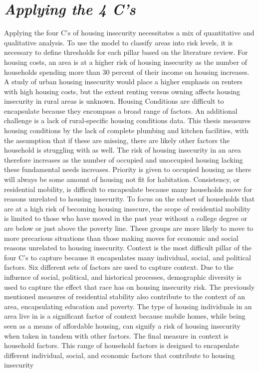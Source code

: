 \section{\textit{Applying the 4 C's}}
Applying the four C's of housing insecurity necessitates a mix of quantitative and qualitative analysis. To use the model to classify areas into risk levels, it is necessary to define thresholds for each pillar based on the literature review. For housing costs, an area is at a higher risk of housing insecurity as the number of households spending more than 30 percent of their income on housing increases. A study of urban housing insecurity would place a higher emphasis on renters with high housing costs, but the extent renting versus owning affects housing insecurity in rural areas is unknown. Housing Conditions are difficult to encapsulate because they encompass a broad range of factors. An additional challenge is a lack of rural-specific housing conditions data. This thesis measures housing conditions by the lack of complete plumbing and kitchen facilities, with the assumption that if these are missing, there are likely other factors the household is struggling with as well. The risk of housing insecurity in an area therefore increases as the number of occupied and unoccupied housing lacking these fundamental needs increases. Priority is given to occupied housing as there will always be some amount of housing not fit for habitation. Consistency, or residential mobility, is difficult to encapsulate because many households move for reasons unrelated to housing insecurity. To focus on the subset of households that are at a high risk of becoming housing insecure, the scope of residential mobility is limited to those who have moved in the past year without a college degree or are below or just above the poverty line. These groups are more likely to move to more precarious situations than those making moves for economic and social reasons unrelated to housing insecurity. Context is the most difficult pillar of the four C's to capture because it encapsulates many individual, social, and political factors. Six different sets of factors are used to capture context. Due to the influence of social, political, and historical processes, demographic diversity is used to capture the effect that race has on housing insecurity risk. The previously mentioned measures of residential stability also contribute to the context of an area, encapsulating education and poverty. The type of housing individuals in an area live in is a significant factor of context because mobile homes, while being seen as a means of affordable housing, can signify a risk of housing insecurity when taken in tandem with other factors. The final measure in context is household factors. This range of household factors is designed to encapsulate different individual, social, and economic factors that contribute to housing insecurity 



